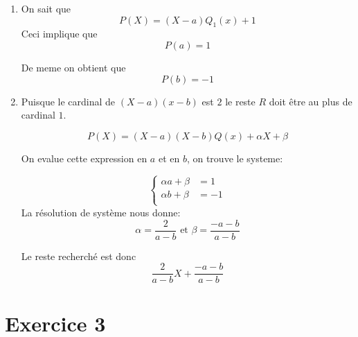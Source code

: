 \documentclass{report}
\begin{document}
\begin{myproof}
  \begin{enumerate}
    \item 
  On sait que $$P(X)=(X-a)Q_1(x) + 1$$
  Ceci implique que 
  $$
  P(a) = 1
  $$

  De meme on obtient que 
  $$
  P(b) = -1
  $$
\item Puisque le cardinal de $(X-a)(x-b)$ est $2$ le reste $R$ doit être au plus de cardinal $1$.

  $$
  P(X) = (X-a)(X-b)Q(x) + \alpha X  + \beta
  $$

  On evalue cette expression en $a$ et en $b$, on trouve le systeme:

  $$
  \begin{cases}
    \alpha a + \beta &= 1\\
    \alpha b + \beta &= -1\\
  \end{cases}
  $$
  La résolution de système nous donne:
  $$
  \alpha = \dfrac{2}{a-b} \text{ et } \beta = \dfrac{-a-b}{a-b}
  $$
  
  Le reste recherché est donc
  $$
  \dfrac{2}{a-b}X + \dfrac{-a-b}{a-b}
  $$


  \end{enumerate}
\end{myproof}


\newpage
\section{Exercice 3} %
\label{sec:Exercice 3}
\end{document}
